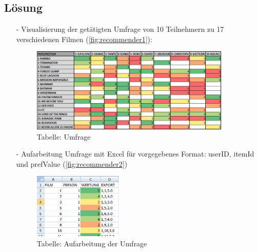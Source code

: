 \subsection*{Lösung}
\begin{itemize}
\item[-] Visualisierung der getätigten Umfrage von 10 Teilnehmern zu 17 verschiedenen Filmen (\autoref{fig:recommender1}):
\begin{figure}[!htb]
        \begin{minipage}{1\textwidth}
                \centering
                \includegraphics[width=0.90\textwidth]{pics/recommender1.png}\par\vspace{0cm}
                \caption{Tabelle: Umfrage}
                \label{fig:recommender1}
        \end{minipage}
\end{figure}

\item[-] Aufarbeitung Umfrage mit Excel für vorgegebenes Format: userID, itemId und prefValue (\autoref{fig:recommender2})
\begin{figure}[!htb]
        \begin{minipage}{1\textwidth}
                \centering
                \includegraphics[width=0.40\textwidth]{pics/recommender2.png}\par\vspace{0cm}
                \caption{Tabelle: Aufarbeitung der Umfrage}
                \label{fig:recommender2}
        \end{minipage}
\end{figure}


\end{itemize}
